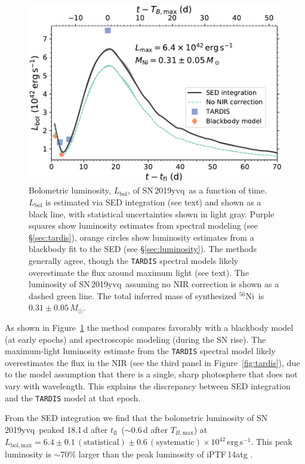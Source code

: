 \documentclass[twocolumn]{aastex63}
\newcommand{\tfl}{$t_\mathrm{fl}$}
\newcommand{\tbmax}{$T_{B,\mathrm{max}}$}
\newcommand{\radni}{$^{56}$Ni}
\newcommand{\sn}{SN\,2019yvq}
\begin{document}
\begin{figure}
    \centering
    \includegraphics[width=\columnwidth]{./figures/L_bolometric.pdf}
    \caption{Bolometric luminosity, $L_\mathrm{bol}$, of \sn\ as a function of
    time. $L_\mathrm{bol}$ is estimated via SED integration (see text) and
    shown as a black line, with statistical uncertainties shown in light gray.
    Purple squares show luminosity estimates from spectral modeling (see
    \S\ref{sec:tardis}), orange circles show luminosity estimates from a
    blackbody fit to the SED (see \S\ref{sec:luminosity}). The methods
    generally agree, though the \texttt{TARDIS} spectral models likely
    overestimate the flux around maximum light (see text). The
    luminosity of \sn\ assuming no NIR correction is shown as a dashed green
    line. The total inferred mass of synthesized \radni\ is $0.31 \pm
    0.05\,M_\odot$.}
    \label{fig:Lbol}
\end{figure}

As shown in Figure~\ref{fig:Lbol} the method compares favorably with a
blackbody model (at early epochs) and spectroscopic modeling (during the SN
rise). The maximum-light luminosity estimate from the \texttt{TARDIS} spectral
model likely overestimates the flux in the NIR (see the third panel in
Figure~\ref{fig:tardis}), due to the model assumption that there is a single,
sharp photosphere that does not vary with wavelength. This explains the
discrepancy between SED integration and the \texttt{TARDIS} model at that
epoch.

From the SED integration we find that the bolometric luminosity of \sn\ peaked
18.1\,d after \tfl\ ($\sim$0.6\,d after \tbmax) at $L_\mathrm{bol,max} = 6.4
\pm 0.1\,(\mathrm{statistical}) \pm 0.6\,(\mathrm{systematic}) \times
10^{42}\,\mathrm{erg\,s}^{-1}$. This peak luminosity is $\sim$70\% larger than
the peak luminosity of iPTF\,14atg \citep[$3.8 \times
10^{42}\,\mathrm{erg\,s}^{-1}$;][]{Kromer16}.
\end{document}

